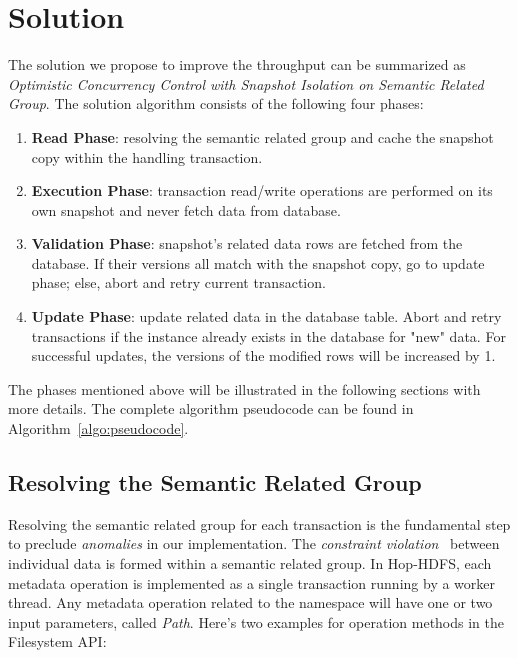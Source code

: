 
%
%


\chapter{Solution}
The solution we propose to improve the throughput can be summarized as \textit{Optimistic Concurrency Control with Snapshot Isolation on Semantic Related Group}. The solution algorithm consists of the following four phases:
\begin{enumerate}[noitemsep]
	\item \textbf{Read Phase}: resolving the semantic related group and cache the snapshot copy within the handling transaction.
	\item \textbf{Execution Phase}: transaction read/write operations are performed on its own snapshot and never fetch data from database.
	\item \textbf{Validation Phase}: snapshot's related data rows are fetched from the database. If their versions all match with the snapshot copy, go to update phase; else, abort and retry current transaction.
	\item \textbf{Update Phase}: update related data in the database table. Abort and retry transactions if the instance already exists in the database for "new" data. For successful updates, the versions of the modified rows will be increased by 1.
\end{enumerate}
\label{ch:Design}

\noindent The phases mentioned above will be illustrated in the following sections with more details. The complete algorithm pseudocode can be found in Algorithm~\ref{algo:pseudocode}.
\section{Resolving the Semantic Related Group}

Resolving the semantic related group for each transaction is the fundamental step to preclude \textit{anomalies} in our implementation. The \textit{constraint violation}~\cite{berenson1995critique} between individual data is formed within a semantic related group. In Hop-HDFS, each metadata operation is implemented as a single transaction running by a worker thread. Any metadata operation related to the namespace will have one or two input parameters, called \textit{Path}. Here's two examples for operation methods in the Filesystem API:

